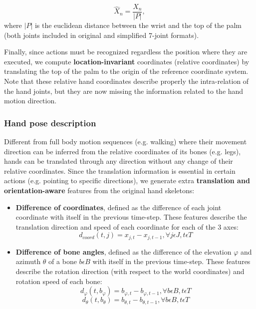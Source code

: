 \documentclass[letterpaper, 10 pt, conference]{ieeeconf}
\begin{document}
\begin{equation}
\hat{X}_{n}=\frac{{X}_{n}}{\left | P \right |},
\end{equation}
where \(\left | P \right |\) is the euclidean distance between the wrist and the top of the palm  (both joints included in original and simplified 7-joint formats).

Finally, since actions must be recognized regardless the position where they are executed, we compute \textbf{location-invariant} coordinates (relative coordinates) by translating the top of the palm to the origin of the reference coordinate system. Note that these relative hand coordinates describe properly the intra-relation of the hand joints, but they are now missing the information related to the hand motion direction.


\subsubsection{Hand pose description}

Different from full body motion sequences (e.g. walking) where their movement direction can be inferred from the relative coordinates of its bones (e.g. legs), hands can be translated through any direction without any change of their relative coordinates. Since the translation information is essential in certain actions (e.g. pointing to specific directions), we generate extra \textbf{translation and orientation-aware} features from the original hand skeletons:
\begin{itemize}
    \item \textbf{Difference of coordinates}, defined as the difference of each joint coordinate with itself in the previous time-step. These features describe the translation direction and speed of each coordinate for each of the 3 axes:
        \begin{equation}
            d_{coord}(t,j) = x_{j,t} - x_{j,t-1}, \forall j \epsilon J, t \epsilon T
        \end{equation}
    \item \textbf{Difference of bone angles}, defined as the difference of the elevation \(\varphi\) and azimuth \(\theta\) of a bone \(b \epsilon B\) with itself in the previous time-step. These features describe the rotation direction (with respect to the world coordinates) and rotation speed of each bone:
        \begin{equation}
            d_{\varphi}(t, b_\varphi) = b_{\varphi,t} - b_{\varphi,t-1}, \forall b \epsilon B, t \epsilon T
        \end{equation}
        \begin{equation}
            d_{\theta}(t, b_\theta) = b_{\theta,t} - b_{\theta,t-1}, \forall b \epsilon B, t \epsilon T
        \end{equation}
\end{itemize}
\end{document}
